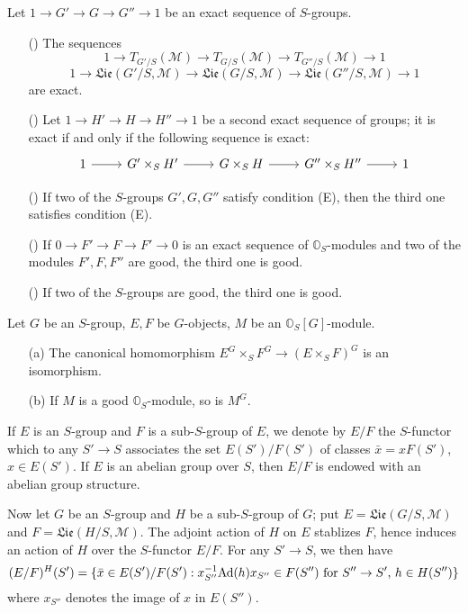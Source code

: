 \begin{lemma}\label{scheme group condition (E) good and exact sequence}
Let $1\to G'\to G\to G''\to 1$ be an exact sequence of $S$-groups.
\begin{enumerate}
    \item[(\rmnum{1})] The sequences
    \[1\to T_{G'/S}(\mathscr{M})\to T_{G/S}(\mathscr{M})\to T_{G''/S}(\mathscr{M})\to 1\]
    \[1\to\mathfrak{Lie}(G'/S,\mathscr{M})\to \mathfrak{Lie}(G/S,\mathscr{M})\to \mathfrak{Lie}(G''/S,\mathscr{M})\to 1\]
    are exact.
    \item[(\rmnum{2})] Let $1\to H'\to H\to H''\to 1$ be a second exact sequence of groups; it is exact if and only if the following sequence is exact:
    \[\begin{tikzcd}
    1\ar[r]&G'\times_SH'\ar[r]&G\times_SH\ar[r]&G''\times_SH''\ar[r]&1
    \end{tikzcd}\]
    \item[(\rmnum{3})] If two of the $S$-groups $G',G,G''$ satisfy condition (E), then the third one satisfies condition (E).
    \item[(\rmnum{4})] If $0\to F'\to F\to F'\to 0$ is an exact sequence of $\mathbb{O}_S$-modules and two of the modules $F',F,F''$ are good, the third one is good.
    \item[(\rmnum{5})] If two of the $S$-groups are good, the third one is good.
\end{enumerate}
\end{lemma}

\begin{lemma}\label{scheme O_S-module good and invariant under group}
Let $G$ be an $S$-group, $E,F$ be $G$-objects, $M$ be an $\mathbb{O}_S[G]$-module.
\begin{enumerate}
    \item[(a)] The canonical homomorphism $E^G\times_SF^G\to (E\times_SF)^G$ is an isomorphism.
    \item[(b)] If $M$ is a good $\mathbb{O}_S$-module, so is $M^G$.
\end{enumerate}
\end{lemma}

If $E$ is an $S$-group and $F$ is a sub-$S$-group of $E$, we denote by $E/F$ the $S$-functor which to any $S'\to S$ associates the set $E(S')/F(S')$ of classes $\bar{x}=xF(S')$, $x\in E(S')$. If $E$ is an abelian group over $S$, then $E/F$ is endowed with an abelian group structure.\par
Now let $G$ be an $S$-group and $H$ be a sub-$S$-group of $G$; put $E=\mathfrak{Lie}(G/S,\mathscr{M})$ and $F=\mathfrak{Lie}(H/S,\mathscr{M})$. The adjoint action of $H$ on $E$ stablizes $F$, hence induces an action of $H$ over the $S$-functor $E/F$. For any $S'\to S$, we then have
\[(E/F)^H(S')=\{\bar{x}\in E(S')/F(S'):\text{$x^{-1}_{S''}\mathrm{Ad}(h)x_{S''}\in F(S'')$ for $S''\to S'$, $h\in H(S'')$}\}\]
where $x_{S''}$ denotes the image of $x$ in $E(S'')$.

